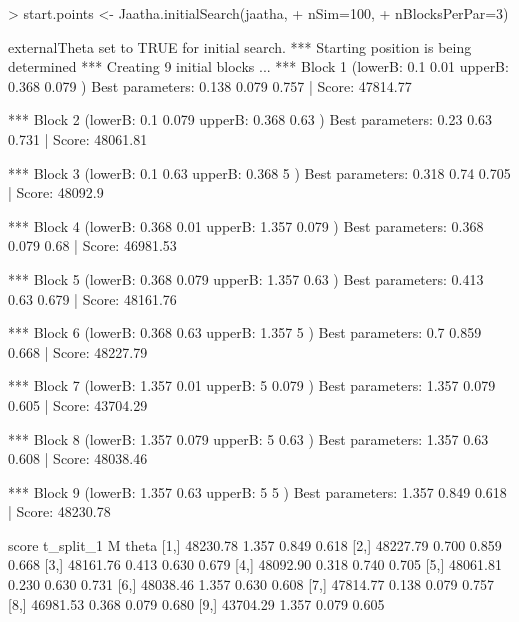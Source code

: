 
\begin{Schunk}
\begin{Sinput}
> start.points <- Jaatha.initialSearch(jaatha, 
+                                      nSim=100, 
+                                      nBlocksPerPar=3)
\end{Sinput}
\begin{Soutput}
externalTheta set to TRUE for initial search. 
*** Starting position is being determined *** 
Creating 9 initial blocks ...  
*** Block 1  (lowerB: 0.1 0.01  upperB: 0.368 0.079 ) 
Best parameters:  0.138 0.079 0.757 | Score: 47814.77 

*** Block 2  (lowerB: 0.1 0.079  upperB: 0.368 0.63 ) 
Best parameters:  0.23 0.63 0.731 | Score: 48061.81 

*** Block 3  (lowerB: 0.1 0.63  upperB: 0.368 5 ) 
Best parameters:  0.318 0.74 0.705 | Score: 48092.9 

*** Block 4  (lowerB: 0.368 0.01  upperB: 1.357 0.079 ) 
Best parameters:  0.368 0.079 0.68 | Score: 46981.53 

*** Block 5  (lowerB: 0.368 0.079  upperB: 1.357 0.63 ) 
Best parameters:  0.413 0.63 0.679 | Score: 48161.76 

*** Block 6  (lowerB: 0.368 0.63  upperB: 1.357 5 ) 
Best parameters:  0.7 0.859 0.668 | Score: 48227.79 

*** Block 7  (lowerB: 1.357 0.01  upperB: 5 0.079 ) 
Best parameters:  1.357 0.079 0.605 | Score: 43704.29 

*** Block 8  (lowerB: 1.357 0.079  upperB: 5 0.63 ) 
Best parameters:  1.357 0.63 0.608 | Score: 48038.46 

*** Block 9  (lowerB: 1.357 0.63  upperB: 5 5 ) 
Best parameters:  1.357 0.849 0.618 | Score: 48230.78 

         score t_split_1     M theta
 [1,] 48230.78     1.357 0.849 0.618
 [2,] 48227.79     0.700 0.859 0.668
 [3,] 48161.76     0.413 0.630 0.679
 [4,] 48092.90     0.318 0.740 0.705
 [5,] 48061.81     0.230 0.630 0.731
 [6,] 48038.46     1.357 0.630 0.608
 [7,] 47814.77     0.138 0.079 0.757
 [8,] 46981.53     0.368 0.079 0.680
 [9,] 43704.29     1.357 0.079 0.605
\end{Soutput}
\end{Schunk}

